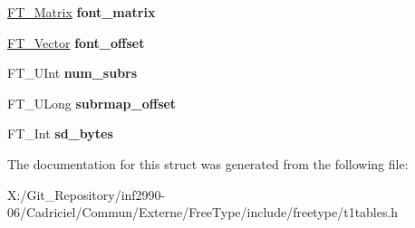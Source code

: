 \begin{DoxyCompactItemize}
\item 
\hypertarget{struct_c_i_d___face_dict_rec___aa418f6ce40b7574b6234e0ab48377e4b}{\hyperlink{struct_f_t___matrix__}{F\-T\-\_\-\-Matrix} {\bfseries font\-\_\-matrix}}\label{struct_c_i_d___face_dict_rec___aa418f6ce40b7574b6234e0ab48377e4b}

\item 
\hypertarget{struct_c_i_d___face_dict_rec___aa62daa8d45ed4a817f1207cbd452d61e}{\hyperlink{struct_f_t___vector__}{F\-T\-\_\-\-Vector} {\bfseries font\-\_\-offset}}\label{struct_c_i_d___face_dict_rec___aa62daa8d45ed4a817f1207cbd452d61e}

\item 
\hypertarget{struct_c_i_d___face_dict_rec___a611c406c8d7cd2e37d077070f4bb3ebe}{F\-T\-\_\-\-U\-Int {\bfseries num\-\_\-subrs}}\label{struct_c_i_d___face_dict_rec___a611c406c8d7cd2e37d077070f4bb3ebe}

\item 
\hypertarget{struct_c_i_d___face_dict_rec___a45d58111727af70018289e7c5b64ba8c}{F\-T\-\_\-\-U\-Long {\bfseries subrmap\-\_\-offset}}\label{struct_c_i_d___face_dict_rec___a45d58111727af70018289e7c5b64ba8c}

\item 
\hypertarget{struct_c_i_d___face_dict_rec___aecdf98f9671f22c1715ec929b77767ce}{F\-T\-\_\-\-Int {\bfseries sd\-\_\-bytes}}\label{struct_c_i_d___face_dict_rec___aecdf98f9671f22c1715ec929b77767ce}

\end{DoxyCompactItemize}


The documentation for this struct was generated from the following file\-:\begin{DoxyCompactItemize}
\item 
X\-:/\-Git\-\_\-\-Repository/inf2990-\/06/\-Cadriciel/\-Commun/\-Externe/\-Free\-Type/include/freetype/t1tables.\-h\end{DoxyCompactItemize}

